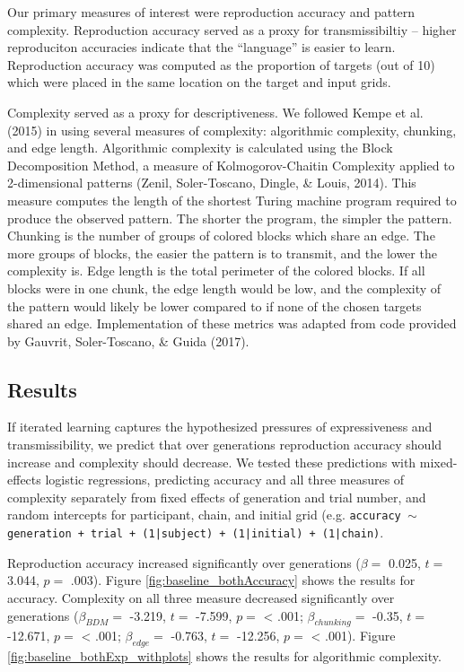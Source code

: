 \documentclass[10pt, letterpaper]{article}
\begin{document}
Our primary measures of interest were reproduction accuracy and pattern
complexity. Reproduction accuracy served as a proxy for transmissibiltiy
-- higher reproduciton accuracies indicate that the ``language'' is
easier to learn. Reproduction accuracy was computed as the proportion of
targets (out of 10) which were placed in the same location on the target
and input grids.

Complexity served as a proxy for descriptiveness. We followed Kempe et
al. (2015) in using several measures of complexity: algorithmic
complexity, chunking, and edge length. Algorithmic complexity is
calculated using the Block Decomposition Method, a measure of
Kolmogorov-Chaitin Complexity applied to 2-dimensional patterns (Zenil,
Soler-Toscano, Dingle, \& Louis, 2014). This measure computes the length
of the shortest Turing machine program required to produce the observed
pattern. The shorter the program, the simpler the pattern. Chunking is
the number of groups of colored blocks which share an edge. The more
groups of blocks, the easier the pattern is to transmit, and the lower
the complexity is. Edge length is the total perimeter of the colored
blocks. If all blocks were in one chunk, the edge length would be low,
and the complexity of the pattern would likely be lower compared to if
none of the chosen targets shared an edge. Implementation of these
metrics was adapted from code provided by Gauvrit, Soler-Toscano, \&
Guida (2017).

\subsection{Results}\label{results}

If iterated learning captures the hypothesized pressures of
expressiveness and transmissibility, we predict that over generations
reproduction accuracy should increase and complexity should decrease. We
tested these predictions with mixed-effects logistic regressions,
predicting accuracy and all three measures of complexity separately from
fixed effects of generation and trial number, and random intercepts for
participant, chain, and initial grid (e.g.
\texttt{accuracy $\sim$ generation + trial + (1|subject) + (1|initial) + (1|chain)}.

Reproduction accuracy increased significantly over generations
(\(\beta =\) 0.025, \(t =\) 3.044, \(p =\) .003). Figure
\ref{fig:baseline_bothAccuracy} shows the results for accuracy.
Complexity on all three measure decreased significantly over generations
(\(\beta_{BDM} =\) -3.219, \(t =\) -7.599, \(p =\) \textless{} .001;
\(\beta_{chunking} =\) -0.35, \(t =\) -12.671, \(p =\) \textless{} .001;
\(\beta_{edge} =\) -0.763, \(t =\) -12.256, \(p =\) \textless{} .001).
Figure \ref{fig:baseline_bothExp_withplots} shows the results for
algorithmic complexity.
\end{document}
